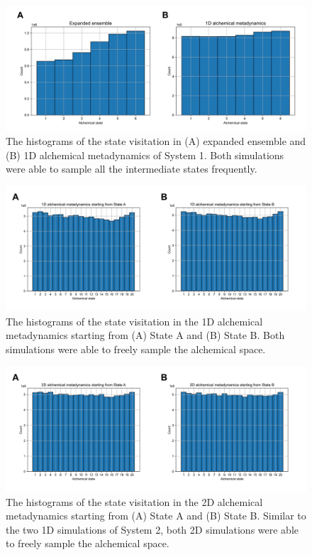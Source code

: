 \documentclass[journal=jacsat,manuscript=article]{achemso}
\begin{document}
\renewcommand{\thefigure}{S\arabic{figure}}
\begin{figure}[H]
    \centering
    \includegraphics[width=\textwidth]{Figures/sys1_histograms.png}   
    \caption{The histograms of the state visitation in (A) expanded ensemble and (B) 1D alchemical metadynamics of System 1. Both simulations were able to sample all the intermediate states frequently.}
    \label{sys1_hist}
\end{figure}

\renewcommand{\thefigure}{S\arabic{figure}}
\begin{figure}[H]
    \centering
    \includegraphics[width=\textwidth]{Figures/1D_lambda_hist.png}   
    \caption{The histograms of the state visitation in the 1D alchemical metadynamics starting from (A) State A and (B) State B. Both simulations were able to freely sample the alchemical space.}
    \label{sys2_1D_hist}
\end{figure}

\renewcommand{\thefigure}{S\arabic{figure}}
\begin{figure}[H]
    \centering
    \includegraphics[width=\textwidth]{Figures/2D_lambda_hist.png}   
    \caption{The histograms of the state visitation in the 2D alchemical metadynamics starting from (A) State A and (B) State B. Similar to the two 1D simulations of System 2, both 2D simulations were able to freely sample the alchemical space.}
    \label{sys2_2D_hist}
\end{figure}
\end{document}
